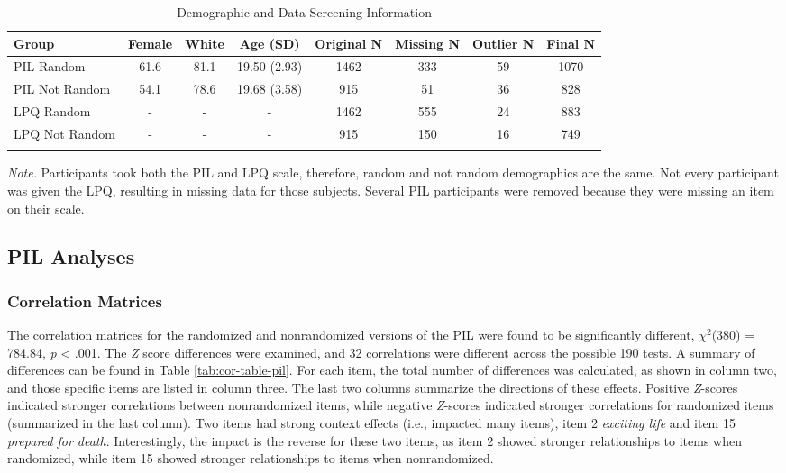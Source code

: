 \documentclass[english,man, mask]{apa6}
\theoremstyle{definition}
\theoremstyle{definition}
\theoremstyle{definition}
\theoremstyle{remark}
\begin{document}
\begin{table}[tbp]
\begin{center}
\begin{threeparttable}
\caption{\label{tab:demo-table}Demographic and Data Screening Information}
\small{
\begin{tabular}{lccccccc}
\toprule
Group & \multicolumn{1}{c}{Female} & \multicolumn{1}{c}{White} & \multicolumn{1}{c}{Age (SD)} & \multicolumn{1}{c}{Original N} & \multicolumn{1}{c}{Missing N} & \multicolumn{1}{c}{Outlier N} & \multicolumn{1}{c}{Final N}\\
\midrule
PIL Random & 61.6 & 81.1 & 19.50 (2.93) & 1462 & 333 & 59 & 1070\\
PIL Not Random & 54.1 & 78.6 & 19.68 (3.58) & 915 & 51 & 36 & 828\\
LPQ Random & - & - & - & 1462 & 555 & 24 & 883\\
LPQ Not Random & - & - & - & 915 & 150 & 16 & 749\\
\bottomrule
\addlinespace
\end{tabular}
}
\begin{tablenotes}[para]
\textit{Note.} Participants took both the PIL and LPQ scale, therefore, random and not random demographics are the same. Not every participant was given the LPQ, resulting in missing data for those subjects. Several PIL participants were removed because they were missing an item on their scale.
\end{tablenotes}
\end{threeparttable}
\end{center}
\end{table}

\subsection{PIL Analyses}\label{pil-analyses}

\subsubsection{Correlation Matrices}\label{correlation-matrices}

The correlation matrices for the randomized and nonrandomized versions
of the PIL were found to be significantly different, \(\chi^2\)(380) =
784.84, \emph{p} \textless{} .001. The \emph{Z} score differences were
examined, and 32 correlations were different across the possible 190
tests. A summary of differences can be found in Table
\ref{tab:cor-table-pil}. For each item, the total number of differences
was calculated, as shown in column two, and those specific items are
listed in column three. The last two columns summarize the directions of
these effects. Positive \emph{Z}-scores indicated stronger correlations
between nonrandomized items, while negative \emph{Z}-scores indicated
stronger correlations for randomized items (summarized in the last
column). Two items had strong context effects (i.e., impacted many
items), item 2 \emph{exciting life} and item 15 \emph{prepared for
death}. Interestingly, the impact is the reverse for these two items, as
item 2 showed stronger relationships to items when randomized, while
item 15 showed stronger relationships to items when nonrandomized.
\end{document}
